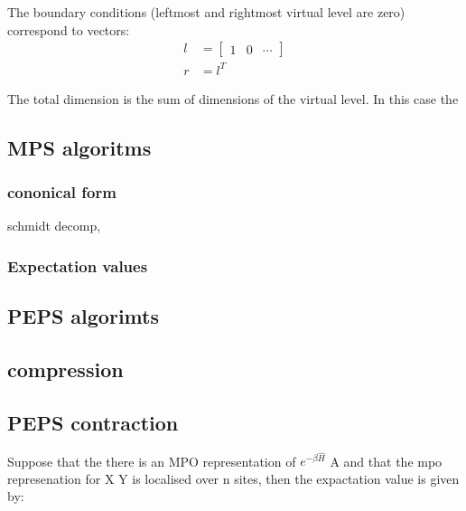 The boundary conditions (leftmost and rightmost virtual level are zero) correspond to vectors:
\begin{equation}
    \begin{split}
        l &= \begin{bmatrix} 1 & 0
                  & \cdots\end{bmatrix} \\
        r &= l^{T}
    \end{split}
\end{equation}

The total dimension is the sum of dimensions of the virtual level. In this case the 

\subsection{MPS algoritms}


\subsubsection{cononical form}

schmidt decomp,

\subsubsection{Expectation values}

\subsection{PEPS algorimts}


\subsection{compression}

\subsection{PEPS contraction}

Suppose that the there is an MPO representation of $ e^{ - \beta \hat{H} } $ A and that the mpo represenation for X Y is localised over n sites, then the expactation value is given by:

